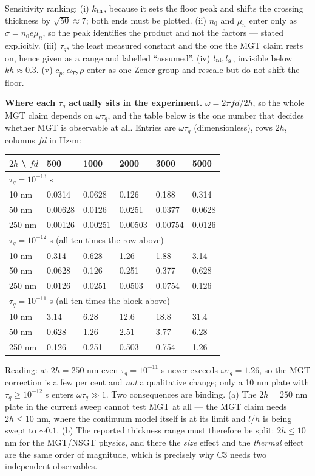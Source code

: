 \documentclass[11pt]{article}
\begin{document}
Sensitivity ranking: (i) $k_{\rm th}$, because it sets the floor peak and shifts the crossing
thickness by $\sqrt{50}\approx7$; both ends must be plotted. (ii) $n_0$ and $\mu_n$ enter only as
$\sigma=n_0e\mu_n$, so the peak identifies the product and not the factors --- stated explicitly.
(iii) $\tau_q$, the least measured constant and the one the MGT claim rests on, hence given as a
range and labelled ``assumed''. (iv) $l_{\rm nl},l_g$, invisible below $kh\approx0.3$.
(v) $c_p,\alpha_T,\rho$ enter as one Zener group and rescale but do not shift the floor.

\textbf{Where each $\tau_q$ actually sits in the experiment.} $\omega=2\pi fd/2h$, so the whole MGT
claim depends on $\omega\tau_q$, and the table below is the one number that decides whether MGT is
observable at all. Entries are $\omega\tau_q$ (dimensionless), rows $2h$, columns $fd$ in Hz$\cdot$m:

\begin{center}\footnotesize
\begin{tabular}{l|lllll}
\toprule
$2h$ \textbackslash{} $fd$ & 500 & 1000 & 2000 & 3000 & 5000\\
\midrule
\multicolumn{6}{l}{$\tau_q=10^{-13}$ s}\\
10 nm  & 0.0314 & 0.0628 & 0.126 & 0.188 & 0.314\\
50 nm  & 0.00628 & 0.0126 & 0.0251 & 0.0377 & 0.0628\\
250 nm & 0.00126 & 0.00251 & 0.00503 & 0.00754 & 0.0126\\
\midrule
\multicolumn{6}{l}{$\tau_q=10^{-12}$ s (all ten times the row above)}\\
10 nm  & 0.314 & 0.628 & 1.26 & 1.88 & 3.14\\
50 nm  & 0.0628 & 0.126 & 0.251 & 0.377 & 0.628\\
250 nm & 0.0126 & 0.0251 & 0.0503 & 0.0754 & 0.126\\
\midrule
\multicolumn{6}{l}{$\tau_q=10^{-11}$ s (all ten times the block above)}\\
10 nm  & 3.14 & 6.28 & 12.6 & 18.8 & 31.4\\
50 nm  & 0.628 & 1.26 & 2.51 & 3.77 & 6.28\\
250 nm & 0.126 & 0.251 & 0.503 & 0.754 & 1.26\\
\bottomrule
\end{tabular}
\end{center}
\noindent Reading: at $2h=250$ nm even $\tau_q=10^{-11}$ s never exceeds $\omega\tau_q=1.26$, so the
MGT correction is a few per cent and \emph{not} a qualitative change; only a 10 nm plate with
$\tau_q\ge10^{-12}$ s enters $\omega\tau_q\gg1$. Two consequences are binding. (a) The $2h=250$ nm
plate in the current sweep cannot test MGT at all --- the MGT claim needs $2h\le10$ nm, where the
continuum model itself is at its limit and $l/h$ is being swept to $\sim0.1$. (b) The reported
thickness range must therefore be split: $2h\le10$ nm for the MGT/NSGT physics, and there the
\emph{size} effect and the \emph{thermal} effect are the same order of magnitude, which is precisely
why C3 needs two independent observables.
\end{document}
